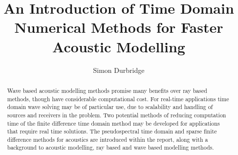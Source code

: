 \documentclass{svproc}
\title{An Introduction of Time Domain Numerical Methods for Faster Acoustic Modelling} %
\author{Simon Durbridge} %
\institute{Dept. Engineering, Mathematics \&\ Computing\\ University of Derby\\
\email{s.durbridge1@unimail.derby.ac.uk} %
} %
\begin{document}
\maketitle %


\begin{abstract}
Wave based acoustic modelling methods promise many benefits over ray based methods, though have considerable computational cost. For real-time applications time domain wave solving may be of particular use, due to scalability and handling of sources and receivers in the problem. Two potential methods of reducing computation time of the finite difference time domain method may be developed for applications that require real time solutions. The pseudospectral time domain and sparse finite difference methods for acoustics are introduced within the report, along with a background to acoustic modelling, ray based and wave based modelling methods. 


\end{abstract}










\end{document}
